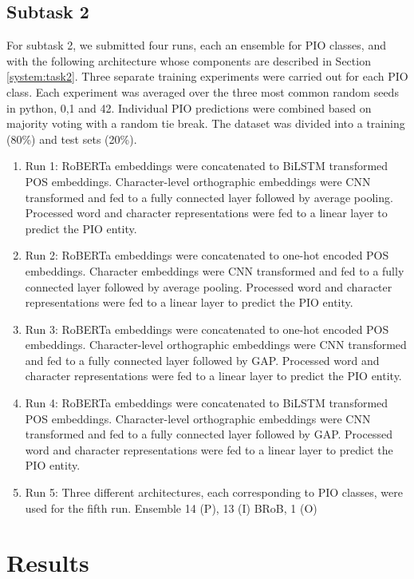 \documentclass[11pt]{article}
\begin{document}
\subsection{Subtask 2}
\label{exps:task2}
%
For subtask 2, we submitted four runs, each an ensemble for PIO classes, and with the following architecture whose components are described in Section \ref{system:task2}.
Three separate training experiments were carried out for each PIO class.
Each experiment was averaged over the three most common random seeds in python, 0,1 and 42.
Individual PIO predictions were combined based on majority voting with a random tie break.
The dataset was divided into a training (80\%) and test sets (20\%).
%
\begin{enumerate}
    \item Run 1: RoBERTa embeddings were concatenated to BiLSTM transformed POS embeddings. Character-level orthographic embeddings were CNN transformed and fed to a fully connected layer followed by average pooling. Processed word and character representations were fed to a linear layer to predict the PIO entity.
    \item Run 2: RoBERTa embeddings were concatenated to one-hot encoded POS embeddings. Character embeddings were CNN transformed and fed to a fully connected layer followed by average pooling. Processed word and character representations were fed to a linear layer to predict the PIO entity.
    \item Run 3: RoBERTa embeddings were concatenated to one-hot encoded POS embeddings. Character-level orthographic embeddings were CNN transformed and fed to a fully connected layer followed by GAP. Processed word and character representations were fed to a linear layer to predict the PIO entity.
    \item Run 4: RoBERTa embeddings were concatenated to BiLSTM transformed POS embeddings. Character-level orthographic embeddings were CNN transformed and fed to a fully connected layer followed by GAP. Processed word and character representations were fed to a linear layer to predict the PIO entity.
    \item Run 5: Three different architectures, each corresponding to PIO classes, were used for the fifth run. Ensemble 14 (P), 13 (I) BRoB, 1 (O)   
\end{enumerate}
%
%
%
\section{Results}
\end{document}
